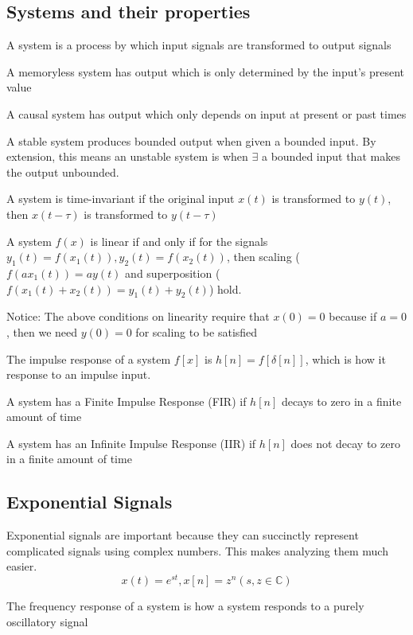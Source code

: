\subsection{Systems and their properties}
\begin{definition}
    A system is a process by which input signals are transformed to output signals
\end{definition}
\begin{definition}
    A memoryless system has output which is only determined by the input's present value
\end{definition}
\begin{definition}
    A causal system has output which only depends on input at present or past times
\end{definition}
\begin{definition}
    A stable system produces bounded output when given a bounded input. By extension,
    this means an unstable system is when $\exists$ a bounded input that makes the output unbounded.
\end{definition}
\begin{definition}
    A system is time-invariant if the original input $x(t)$ is transformed to $y(t)$, then
    $x(t-\tau)$ is transformed to $y(t-\tau)$
\end{definition}
\begin{definition}
  A system $f(x)$ is linear if and only if for the signals $y_1(t) = f(x_1(t)), y_2(t) = f(x_2(t))$, then scaling ($f(a x_1(t)) = a y(t)$ and superposition ($f(x_1(t) + x_2(t)) = y_1(t) + y_2(t)$) hold.
\end{definition}
Notice: The above conditions on linearity require that $x(0) = 0$ because if $a = 0$, then we need $y(0) = 0$ for scaling to be satisfied
\begin{definition}
    The impulse response of a system $f[x]$ is $h[n] = f[\delta[n]]$, which is how it response to an impulse input. 
\end{definition}
\begin{definition}
    A system has a Finite Impulse Response (FIR) if $h[n]$ decays to zero in a finite
    amount of time
\end{definition}
\begin{definition}
    A system has an Infinite Impulse Response (IIR) if $h[n]$ does not decay to zero in a finite
    amount of time
\end{definition}
\subsection{Exponential Signals}
Exponential signals are important because they can succinctly represent
complicated signals using complex numbers. This makes analyzing them much easier.
\[
x(t) = e^{st}, x[n] = z^n (s, z \in \mathbb{C})
\]
\begin{definition}
    The frequency response of a system is how a system responds to a purely oscillatory signal
\end{definition}
